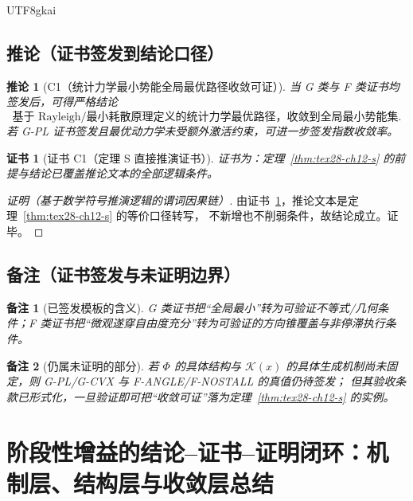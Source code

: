 \documentclass[12pt]{article}
\newtheorem{corollary}{推论}[section]
\newtheorem{remark}{备注}[section]
\newtheorem{Certificate}{证书}[section]
\begin{document}
\begin{CJK*}{UTF8}{gkai}
\subsection{推论（证书签发到结论口径）}
\label{subsec:tex28-ch12-corollaries}

\begin{corollary}[C1（统计力学最小势能全局最优路径收敛可证）]
\label{cor:tex28-ch12-c1}
当 G 类与 F 类证书均签发后，可得严格结论
\[
  \boxed{
    \text{基于 Rayleigh/最小耗散原理定义的统计力学最优路径，收敛到全局最小势能集}
  }.
\]
若 G-PL 证书签发且最优动力学未受额外激活约束，可进一步签发指数收敛率。
\end{corollary}

\begin{Certificate}[证书 C1（定理 S 直接推演证书）]
\label{cert:tex28-ch12-c1}
证书为：定理~\ref{thm:tex28-ch12-s} 的前提与结论已覆盖推论文本的全部逻辑条件。
\end{Certificate}

\begin{proof}[证明（基于数学符号推演逻辑的谓词因果链）]
由证书~\ref{cert:tex28-ch12-c1}，推论文本是定理~\ref{thm:tex28-ch12-s} 的等价口径转写，
不新增也不削弱条件，故结论成立。证毕。
\end{proof}

\subsection{备注（证书签发与未证明边界）}
\label{subsec:tex28-ch12-remarks}

\begin{remark}[已签发模板的含义]
G 类证书把“全局最小”转为可验证不等式/几何条件；F 类证书把“微观遂穿自由度充分”转为可验证的方向锥覆盖与非停滞执行条件。
\end{remark}

\begin{remark}[仍属未证明的部分]
若 $\Phi$ 的具体结构与 $\mathcal{K}(x)$ 的具体生成机制尚未固定，则 G-PL/G-CVX 与 F-ANGLE/F-NOSTALL 的真值仍待签发；
但其验收条款已形式化，一旦验证即可把“收敛可证”落为定理~\ref{thm:tex28-ch12-s} 的实例。
\end{remark}

\clearpage

\section{阶段性增益的结论--证书--证明闭环：机制层、结构层与收敛层总结}
\label{sec:tex28-ch13}


\end{CJK*}
\end{document}
